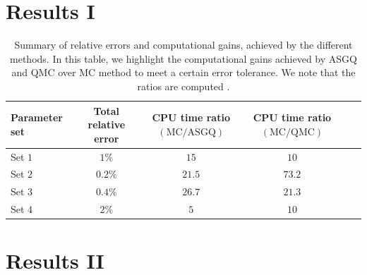 \documentclass[ima, 20pt, portrait, plainboxedsections]{sciposter}
\begin{document}
\begin{multicols}{3}
\section*{Results I}
\begin{table}[!h]
	\centering
	\caption{Summary of relative errors and computational gains, achieved by the different methods. In this table, we highlight the computational gains achieved by ASGQ and QMC over MC method to meet a certain error tolerance. We note that the ratios are computed .}
	\begin{small}
		\begin{tabular}{l*{4}{c}r}
			\toprule[1.5pt]
			\textbf{Parameter set}              &  \textbf{Total relative error}  & \textbf{CPU time ratio $\left(\text{MC}/ \text{ASGQ} \right)$} & \textbf{CPU time ratio  $\left(\text{MC}/ \text{QMC} \right)$}\\
			\hline
			Set $1$  &  $1\%$&  $ 15$ &  $10$\\	
			
			\hline
		Set $2$    &  $0.2\%$&  $21.5$ &  $73.2$\\		
			\hline
		Set $3$   &  $0.4\%$&  $26.7$ &  $21.3$\\	
			\hline
		Set $4$ &  $2\%$&  $5$ &  $10$\\	
			\bottomrule[1.25pt]
		\end{tabular}
	\end{small}
	\label{table:Summary of our numerical results.}

\end{table}
\section*{Results II}


\end{multicols}
\end{document}
